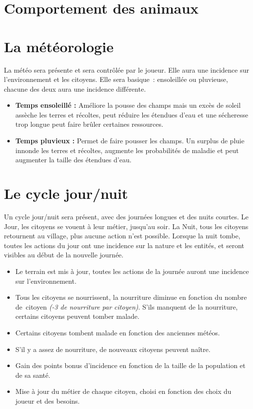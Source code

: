\documentclass[a4paper]{article}
\newcommand{\alinea}{\hspace*{0.5cm}}
\begin{document}
    \section{Comportement des animaux}


    \section{La météorologie}
      \alinea La météo sera présente et sera contrôlée par le joueur. Elle aura une incidence sur l'environnement et les citoyens. Elle sera basique : ensoleillée ou pluvieuse, chacune des deux aura une incidence différente. 
      \begin{itemize} \small
        \item \textbf{Temps ensoleillé :} Améliore la pousse des champs mais un excès de soleil assèche les terres et récoltes, peut réduire les étendues d'eau et une sécheresse trop longue peut faire brûler certaines ressources.
        \item \textbf{Temps pluvieux :} Permet de faire pousser les champs. Un surplus de pluie innonde les terres et récoltes, augmente les probabilités de maladie et peut augmenter la taille des étendues d'eau.
      \end{itemize} \normalsize


    \section{Le cycle jour/nuit}
      \label{Cycle}
      \alinea Un cycle jour/nuit sera présent, avec des journées longues et des nuits courtes. Le Jour, les citoyens se vouent à leur métier, jusqu'au soir. La Nuit, tous les citoyens retournent au village, plus aucune action n'est possible. Lorsque la nuit tombe, toutes les actions du jour ont une incidence sur la nature et les entités, et seront visibles au début de la nouvelle journée.
      \begin{itemize} \small
        \item Le terrain est mis à jour, toutes les actions de la journée auront une incidence sur l'environnement.
        \item Tous les citoyens se nourrissent, la nourriture diminue en fonction du nombre de citoyen \textit{(-3 de nourriture par citoyen)}. S'ils manquent de la nourriture, certains citoyens peuvent tomber malade.
        \item Certains citoyens tombent malade en fonction des anciennes météos.
        \item S'il y a assez de nourriture, de nouveaux citoyens peuvent naître.
        \item Gain des points bonus d'incidence en fonction de la taille de la population et de sa santé.
        \item Mise à jour du métier de chaque citoyen, choisi en fonction des choix du joueur et des besoins.
      \end{itemize} \normalsize
\end{document}
